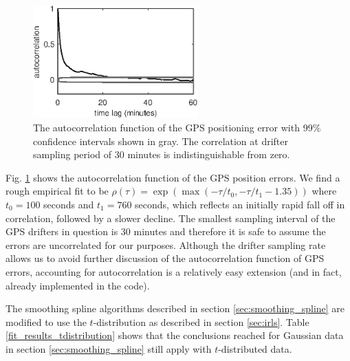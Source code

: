 \documentclass{ametsoc}
\begin{document}
\begin{figure}
  \centerline{\includegraphics[width=15pc,angle=0]{gps_autocorrelation.eps}}
  \caption{The autocorrelation function of the GPS positioning error with 99\% confidence intervals shown in gray. The correlation at drifter sampling period of 30 minutes is indistinguishable from zero.} 
  \label{gps_autocorrelation}
\end{figure}

Fig. \ref{gps_autocorrelation} shows the autocorrelation function of the GPS position errors. We find a rough empirical fit to be $\rho(\tau)=\exp\left(\max(-\tau/t_0,-\tau/t_1-1.35)\right)$ where $t_0=100$ seconds and $t_1=760$ seconds, which reflects an initially rapid fall off in correlation, followed by a slower decline. The smallest sampling interval of the GPS drifters in question is 30 minutes and therefore it is safe to assume the errors are uncorrelated for our purposes. Although the drifter sampling rate allows us to avoid further discussion of the autocorrelation function of GPS errors, accounting for autocorrelation is a relatively easy extension (and in fact, already implemented in the code).

The smoothing spline algorithms described in section \ref{sec:smoothing_spline} are modified to use the $t$-distribution as described in section \ref{sec:irls}. Table \ref{fit_results_tdistribution} shows that the conclusions reached for Gaussian data in section \ref{sec:smoothing_spline} still apply with $t$-distributed data.
\end{document}
